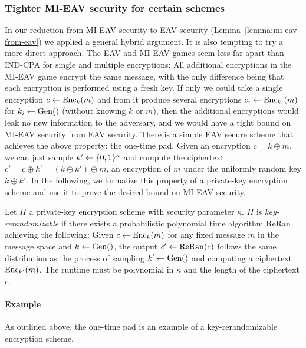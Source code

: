 \subsubsection{Tighter MI-EAV security for certain schemes}

In our reduction from MI-EAV security to EAV security (Lemma~\ref{lemma:mi-eav-from-eav}) we applied a general hybrid argument. It is also tempting to try a more direct approach. The EAV and MI-EAV games seem less far apart than IND-CPA for single and multiple encryptions: All additional encryptions in the MI-EAV game encrypt the same message, with the only difference being that each encryption is performed using a fresh key. If only we could take a single encryption $c \leftarrow \mathrm{Enc}_k(m)$ and from it produce several encryptions $c_i \leftarrow \mathrm{Enc}_{k_i}(m)$ for $k_i \leftarrow \mathrm{Gen}()$ (without knowing $k$ or $m$), then the additional encryptions would leak no new information to the adversary, and we would have a tight bound on MI-EAV security from EAV security. There is a simple EAV secure scheme that achieves the above property: the one-time pad. Given an encryption $c = k \oplus m$, we can just sample $k' \leftarrow \{0, 1\}^\kappa$ and compute the ciphertext $c' = c \oplus k' = (k \oplus k') \oplus m$, an encryption of $m$ under the uniformly random key $k \oplus k'$. In the following, we formalize this property of a private-key encryption scheme and use it to prove the desired bound on MI-EAV security.

\begin{definition} \label{def:key-rerandomizability}
	Let $\Pi$ a private-key encryption scheme with security parameter $\kappa$. $\Pi$ is \emph{key-rerandomizable} if there exists a probabilistic polynomial time algorithm $\mathrm{ReRan}$ achieving the following: Given $c \leftarrow \mathrm{Enc}_k(m)$ for any fixed message $m$ in the message space and $k \leftarrow \mathrm{Gen}()$, the output $c' \leftarrow \mathrm{ReRan}(c)$ follows the same distribution as the process of sampling $k' \leftarrow \mathrm{Gen}()$ and computing a ciphertext $\mathrm{Enc}_{k'}(m)$. The runtime must be polynomial in $\kappa$ and the length of the ciphertext $c$.
\end{definition}

\paragraph{Example} As outlined above, the one-time pad is an example of a key-rerandomizable encryption scheme.


